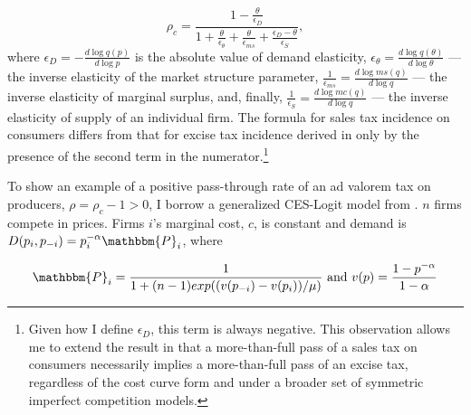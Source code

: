 \documentclass[12pt]{article}
\begin{document}
\begin{equation}
\label{eq:salesro}
\rho_c=%
\frac{1-\frac{\theta}{\epsilon_D}}{1+\frac{\theta}{\epsilon_\theta}+\frac{\theta}{\epsilon_{ms}}+
	\frac{\epsilon_D-\theta}{\epsilon_S}},
\end{equation}	
where $\epsilon_D=-\frac{d\log q(p)}{d\log p}$ is the absolute value of demand elasticity,  $\epsilon_\theta=\frac{d\log q(\theta)}{d\log \theta}$ --- the inverse elasticity of the market structure parameter, $\frac{1}{\epsilon_{ms}}=\frac{d \log ms(q)}{d \log q}$ --- the inverse elasticity of marginal surplus, and, finally, $\frac{1}{\epsilon_S}=\frac{d \log mc(q)}{d \log q}$ --- the inverse elasticity of supply of an individual firm. The formula for sales tax incidence on consumers differs from that for excise tax incidence derived in \citet{fabinger} only by the presence of the second term in the numerator.\footnote{Given how I define $\epsilon_D$, this term is always negative. This observation allows me to extend the result in \citet{anderson} that a more-than-full pass of a sales tax on consumers necessarily implies a more-than-full pass of an excise tax, regardless of the cost curve form and under a broader set of symmetric imperfect competition models.}


To show an example of a positive pass-through rate of an ad valorem tax on producers, $\rho=\rho_c-1>0$, I borrow a generalized CES-Logit model from \citet{anderson}. $n$ firms compete in prices. Firms $i$'s marginal cost, $c$, is constant and demand is $D(p_i, p_{-i})=p^{-\alpha}_i \mathbbm{P}_i$, where

\begin{equation}
\label{eq:dmp}
\mathbbm{P}_i=\frac{1}{1+(n-1)exp((v(p_{-i})-v(p_i))/\mu)} \text{ and } v(p)=\frac{1-p^{-\alpha}}{1-\alpha}
\end{equation}
\end{document}
